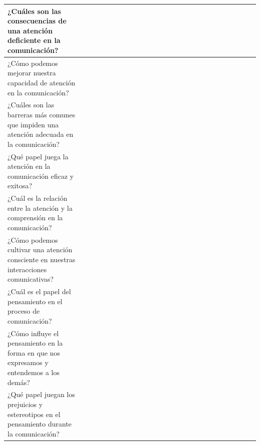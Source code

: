 \documentclass[12pt,a4paper]{article}
\begin{document}
\begin{landscape}
\begin{table}[ht!]
\begin{tabular}{llllllllllllllllllllllllll}
			¿Cuáles son las consecuencias de una atención deficiente en la comunicación?                           &                                          &    &    &    &    &    &    &    &    &     &     &     &     &     &     &     &     &     &     &     &           \\\hline
			¿Cómo podemos mejorar nuestra capacidad de atención en la comunicación?                                &                                          &    &    &    &    &    &    &    &    &     &     &     &     &     &     &     &     &     &     &     &           \\\hline
			¿Cuáles son las barreras más comunes que impiden una atención adecuada en la comunicación?             &                                          &    &    &    &    &    &    &    &    &     &     &     &     &     &     &     &     &     &     &     &           \\\hline
			¿Qué papel juega la atención en la comunicación eficaz y exitosa?                                      &                                          &    &    &    &    &    &    &    &    &     &     &     &     &     &     &     &     &     &     &     &           \\\hline
			¿Cuál es la relación entre la atención y la comprensión en la comunicación?                            &                                          &    &    &    &    &    &    &    &    &     &     &     &     &     &     &     &     &     &     &     &           \\\hline
			¿Cómo podemos cultivar una atención consciente en nuestras interacciones comunicativas?                &                                          &    &    &    &    &    &    &    &    &     &     &     &     &     &     &     &     &     &     &     &           \\\hline
			¿Cuál es el papel del pensamiento en el proceso de comunicación?                                       &                                          &    &    &    &    &    &    &    &    &     &     &     &     &     &     &     &     &     &     &     &           \\\hline
			¿Cómo influye el pensamiento en la forma en que nos expresamos y entendemos a los demás?               &                                          &    &    &    &    &    &    &    &    &     &     &     &     &     &     &     &     &     &     &     &           \\\hline
			¿Qué papel juegan los prejuicios y estereotipos en el pensamiento durante la comunicación?             &                                          &    &    &    &    &    &    &    &    &     &     &     &     &     &     &     &     &     &     &     &           \\\hline

\end{tabular}
\end{table}
\end{landscape}
\end{document}
